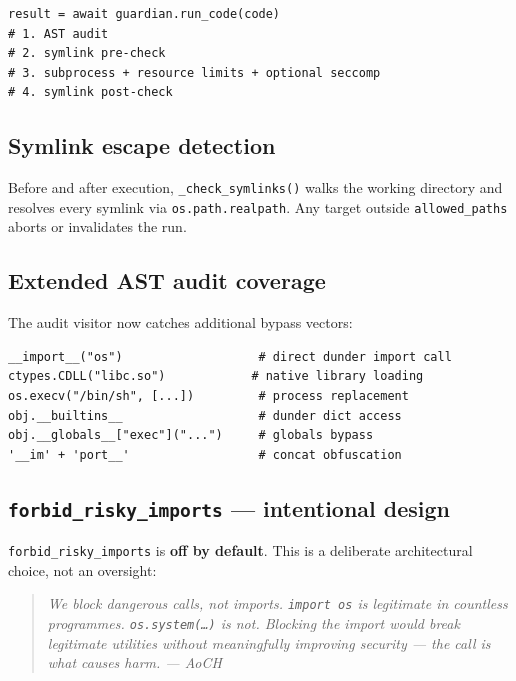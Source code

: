 \documentclass[11pt, a4paper]{article}
\begin{document}
\begin{lstlisting}[caption={Sandbox entry point — one call, full pipeline}]
result = await guardian.run_code(code)
# 1. AST audit
# 2. symlink pre-check
# 3. subprocess + resource limits + optional seccomp
# 4. symlink post-check
\end{lstlisting}

\subsection{Symlink escape detection}


Before and after execution, \texttt{\_check\_symlinks()} walks the working
directory and resolves every symlink via \texttt{os.path.realpath}. Any target
outside \texttt{allowed\_paths} aborts or invalidates the run.

\subsection{Extended AST audit coverage}


The audit visitor now catches additional bypass vectors:

\begin{lstlisting}[caption={New blocked patterns in v2.2}]
__import__("os")                   # direct dunder import call
ctypes.CDLL("libc.so")            # native library loading
os.execv("/bin/sh", [...])         # process replacement
obj.__builtins__                   # dunder dict access
obj.__globals__["exec"]("...")     # globals bypass
'__im' + 'port__'                  # concat obfuscation
\end{lstlisting}

\subsection{\texttt{forbid\_risky\_imports} — intentional design}


\texttt{forbid\_risky\_imports} is \textbf{off by default}. This is a deliberate
architectural choice, not an oversight:

\begin{quote}
  \itshape We block dangerous calls, not imports.
  \texttt{import os} is legitimate in countless programmes.
  \texttt{os.system(\ldots)} is not. Blocking the import would break
  legitimate utilities without meaningfully improving security
  — the call is what causes harm. — AoCH
\end{quote}
\end{document}
